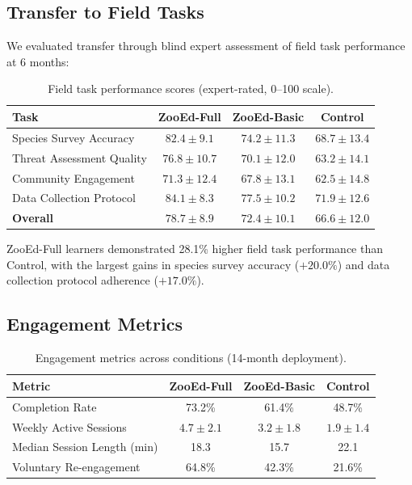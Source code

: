 \documentclass[11pt,a4paper]{article}
\begin{document}
\subsection{Transfer to Field Tasks}

We evaluated transfer through blind expert assessment of field task performance at 6 months:

\begin{table}[H]
\centering
\caption{Field task performance scores (expert-rated, 0--100 scale).}
\label{tab:transfer}
\begin{tabular}{@{}lccc@{}}
\toprule
\textbf{Task} & \textbf{ZooEd-Full} & \textbf{ZooEd-Basic} & \textbf{Control} \\
\midrule
Species Survey Accuracy & $82.4 \pm 9.1$ & $74.2 \pm 11.3$ & $68.7 \pm 13.4$ \\
Threat Assessment Quality & $76.8 \pm 10.7$ & $70.1 \pm 12.0$ & $63.2 \pm 14.1$ \\
Community Engagement & $71.3 \pm 12.4$ & $67.8 \pm 13.1$ & $62.5 \pm 14.8$ \\
Data Collection Protocol & $84.1 \pm 8.3$ & $77.5 \pm 10.2$ & $71.9 \pm 12.6$ \\
\midrule
\textbf{Overall} & $\mathbf{78.7 \pm 8.9}$ & $72.4 \pm 10.1$ & $66.6 \pm 12.0$ \\
\bottomrule
\end{tabular}
\end{table}

ZooEd-Full learners demonstrated 28.1\% higher field task performance than Control, with the largest gains in species survey accuracy ($+20.0\%$) and data collection protocol adherence ($+17.0\%$).

\subsection{Engagement Metrics}

\begin{table}[H]
\centering
\caption{Engagement metrics across conditions (14-month deployment).}
\label{tab:engagement}
\begin{tabular}{@{}lccc@{}}
\toprule
\textbf{Metric} & \textbf{ZooEd-Full} & \textbf{ZooEd-Basic} & \textbf{Control} \\
\midrule
Completion Rate & 73.2\% & 61.4\% & 48.7\% \\
Weekly Active Sessions & $4.7 \pm 2.1$ & $3.2 \pm 1.8$ & $1.9 \pm 1.4$ \\
Median Session Length (min) & 18.3 & 15.7 & 22.1 \\
Voluntary Re-engagement & 64.8\% & 42.3\% & 21.6\% \\
\bottomrule
\end{tabular}
\end{table}
\end{document}
